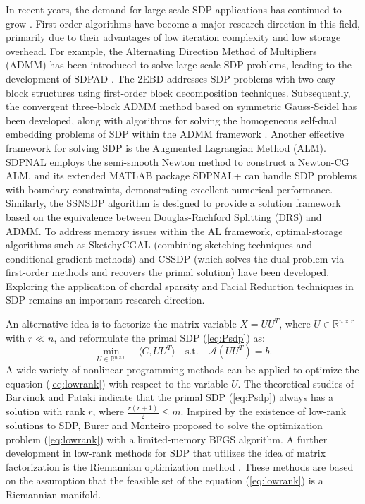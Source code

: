 \documentclass{jcmlatex}
\begin{document}
In recent years, the demand for large-scale SDP applications has continued to grow \cite{majumdar2020recent}. First-order algorithms have become a major research direction in this field, primarily due to their advantages of low iteration complexity and low storage overhead. For example, the Alternating Direction Method of Multipliers (ADMM) has been introduced to solve large-scale SDP problems, leading to the development of SDPAD \cite{wen2010alternating}. The 2EBD \cite{monteiro2014first} addresses SDP problems with two-easy-block structures using first-order block decomposition techniques. Subsequently, the convergent three-block ADMM method based on symmetric Gauss-Seidel \cite{sun2015convergent} has been developed, along with algorithms for solving the homogeneous self-dual embedding problems of SDP within the ADMM framework \cite{o2016conic}. Another effective framework for solving SDP is the Augmented Lagrangian Method (ALM). SDPNAL \cite{zhao2010newton} employs the semi-smooth Newton method to construct a Newton-CG ALM, and its extended MATLAB package SDPNAL+ \cite{yang2015sdpnal+} can handle SDP problems with boundary constraints, demonstrating excellent numerical performance. Similarly, the SSNSDP algorithm \cite{li2018semismooth} is designed to provide a solution framework based on the equivalence between Douglas-Rachford Splitting (DRS) and ADMM. To address memory issues within the AL framework, optimal-storage algorithms such as SketchyCGAL \cite{yurtsever2021scalable} (combining sketching techniques \cite{tropp2017practical} and conditional gradient methods) and CSSDP \cite{ding2021optimal} (which solves the dual problem via first-order methods and recovers the primal solution) have been developed. Exploring the application of chordal sparsity \cite{tang2024exploring,zheng2020chordal} and Facial Reduction \cite{hu2023facial,permenter2018partial} techniques in SDP remains an important research direction.  

An alternative idea is to factorize the matrix variable \(X = UU^{T}\), where \(U \in \mathbb{R}^{n\times r}\) with \(r\ll n\), and reformulate the primal SDP (\ref{eq:Psdp}) as:
\begin{equation}\label{eq:lowrank}
\underset{U\in \mathbb{R}^{n \times r}}{\min}\quad\langle C,UU^{T} \rangle\quad \text{s.t.}\quad \mathcal{A}(UU^{T})=b.
\end{equation}
A wide variety of nonlinear programming methods can be applied to optimize the equation (\ref{eq:lowrank}) with respect to the variable \(U\). The theoretical studies of Barvinok \cite{barvinok1995problems} and Pataki \cite{burer2003nonlinear} indicate that the primal SDP (\ref{eq:Psdp}) always has a solution with rank \(r\), where \(\frac{r(r + 1)}{2} \leq m\). Inspired by the existence of low-rank solutions to SDP, Burer and Monteiro \cite{burer2003nonlinear} proposed to solve the optimization problem (\ref{eq:lowrank}) with a limited-memory BFGS algorithm. A further development in low-rank methods for SDP that utilizes the idea of matrix factorization is the Riemannian optimization method \cite{journee2010low,wen2013feasible,boumal2015riemannian,wang2023decomposition,tang2024feasible}. These methods are based on the assumption that the feasible set of the equation (\ref{eq:lowrank}) is a Riemannian manifold. 
\end{document}

